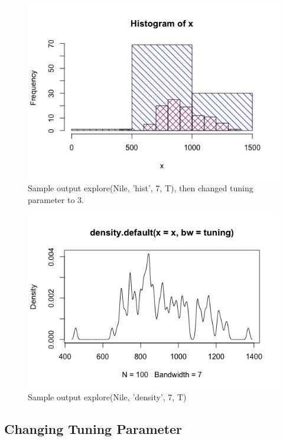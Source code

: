 \documentclass{article}
\begin{document}
\begin{figure}[h!]
\centering
\includegraphics[scale=0.5]{Nile, 3 superimposed on 7 hist.jpeg}
\caption{Sample output explore(Nile, 'hist', 7, T), then changed tuning parameter to 3.}
\label{fig:Nile density graph}
\end{figure}


\begin{figure}[h!]
\centering
\includegraphics[scale=0.5]{Nile, 7 Tuning param.jpeg}
\caption{Sample output explore(Nile, 'density', 7, T)}
\label{fig:Nile density graph}
\end{figure}

\subsection{Changing Tuning Parameter}
\end{document}
